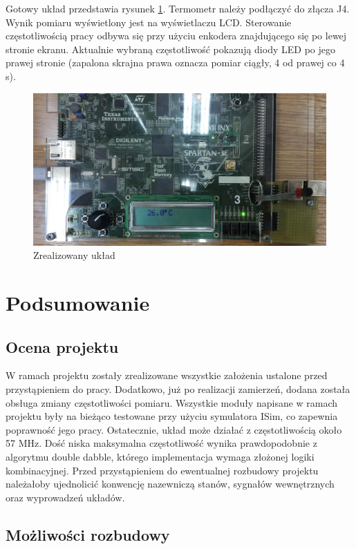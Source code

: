 \documentclass[a4paper]{article}
\begin{document}
Gotowy układ przedstawia rysunek \ref{photo}. Termometr należy podłączyć do złącza J4. Wynik pomiaru wyświetlony jest na wyświetlaczu LCD. Sterowanie częstotliwością pracy odbywa się przy użyciu enkodera znajdującego się po lewej stronie ekranu. Aktualnie wybraną częstotliwość pokazują diody LED po jego prawej stronie (zapalona skrajna prawa oznacza pomiar ciągły, 4 od prawej co 4 s).

\begin{figure}[H]
\begin{center}
\includegraphics[width=16cm]{graphics/photo.png}
\end{center}
\caption{Zrealizowany układ}
\label{photo}
\end{figure} 

\section{Podsumowanie}
\subsection{Ocena projektu}

W ramach projektu zostały zrealizowane wszystkie założenia ustalone przed przystąpieniem do pracy. Dodatkowo, już po realizacji zamierzeń, dodana została obsługa zmiany częstotliwości pomiaru. Wszystkie moduły napisane w ramach projektu były na bieżąco testowane przy użyciu symulatora ISim, co zapewnia poprawność jego pracy. Ostatecznie, układ może działać z częstotliwością około 57 MHz. Dość niska maksymalna częstotliwość wynika prawdopodobnie z algorytmu double dabble, którego implementacja wymaga złożonej logiki kombinacyjnej. Przed przystąpieniem do ewentualnej rozbudowy projektu należałoby ujednolicić konwencję nazewniczą stanów, sygnałów wewnętrznych oraz wyprowadzeń układów.

\subsection{Możliwości rozbudowy}
\end{document}
